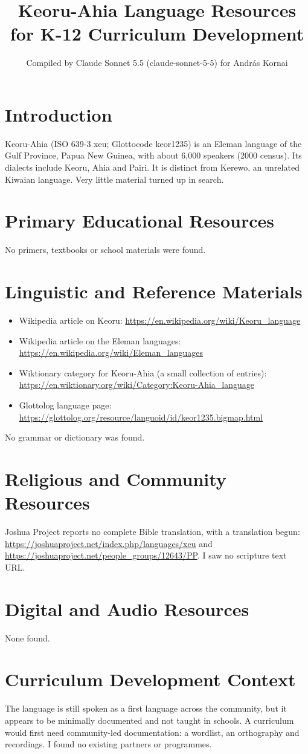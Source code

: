 \documentclass[12pt]{article}
\title{Keoru-Ahia Language Resources for K-12 Curriculum Development}
\author{Compiled by Claude Sonnet 5.5 (claude-sonnet-5-5) for Andr\'as Kornai}
\date{}
\begin{document}
\maketitle

\section{Introduction}
Keoru-Ahia (ISO 639-3 xeu; Glottocode keor1235) is an Eleman language of the Gulf Province, Papua New Guinea, with about 6,000 speakers (2000 census). Its dialects include Keoru, Ahia and Pairi. It is distinct from Kerewo, an unrelated Kiwaian language. Very little material turned up in search.

\section{Primary Educational Resources}
No primers, textbooks or school materials were found.

\section{Linguistic and Reference Materials}
\begin{itemize}
\item Wikipedia article on Keoru: \url{https://en.wikipedia.org/wiki/Keoru_language}
\item Wikipedia article on the Eleman languages: \url{https://en.wikipedia.org/wiki/Eleman_languages}
\item Wiktionary category for Keoru-Ahia (a small collection of entries): \url{https://en.wiktionary.org/wiki/Category:Keoru-Ahia_language}
\item Glottolog language page: \url{https://glottolog.org/resource/languoid/id/keor1235.bigmap.html}
\end{itemize}
No grammar or dictionary was found.

\section{Religious and Community Resources}
Joshua Project reports no complete Bible translation, with a translation begun: \url{https://joshuaproject.net/index.php/languages/xeu} and \url{https://joshuaproject.net/people_groups/12643/PP}. I saw no scripture text URL.

\section{Digital and Audio Resources}
None found.

\section{Curriculum Development Context}
The language is still spoken as a first language across the community, but it appears to be minimally documented and not taught in schools. A curriculum would first need community-led documentation: a wordlist, an orthography and recordings. I found no existing partners or programmes.
\end{document}
